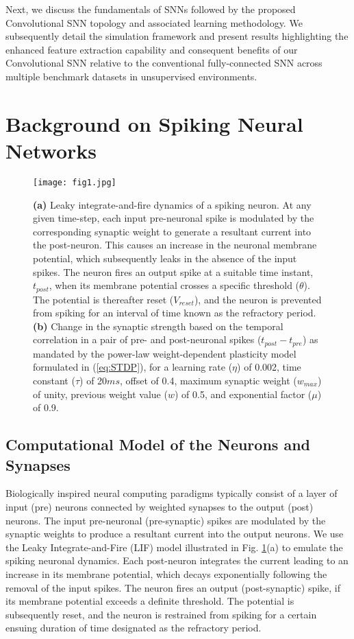 \documentclass[journal, onecolumn]{IEEEtran}
\begin{document}
Next, we discuss the fundamentals of SNNs followed by the proposed Convolutional SNN topology and associated learning methodology. We subsequently detail the simulation framework and present results highlighting the enhanced feature extraction capability and consequent benefits of our Convolutional SNN relative to the conventional fully-connected SNN across multiple benchmark datasets in unsupervised environments.
\section*{\large\bf{Background on Spiking Neural Networks}}
\begin{figure}[!t]
\centering
\texttt{[image: fig1.jpg]}
\caption{\textbf{(a)} Leaky integrate-and-fire dynamics of a spiking neuron. At any given time-step, each input pre-neuronal spike is modulated by the corresponding synaptic weight to generate a resultant current into the post-neuron. This causes an increase in the neuronal membrane potential, which subsequently leaks in the absence of the input spikes. The neuron fires an output spike at a suitable time instant, $t_{post}$, when its membrane potential crosses a specific threshold ($\theta$). The potential is thereafter reset ($V_{reset}$), and the neuron is prevented from spiking for an interval of time known as the refractory period. \textbf{(b)} Change in the synaptic strength based on the temporal correlation in a pair of pre- and post-neuronal spikes ($t_{post}-t_{pre}$) as mandated by the power-law weight-dependent plasticity model formulated in (\ref{eq:STDP}), for a learning rate ($\eta$) of 0.002, time constant ($\tau$) of 20$ms$, offset of 0.4, maximum synaptic weight ($w_{max}$) of unity, previous weight value ($w$) of 0.5, and exponential factor ($\mu$) of 0.9.}
\label{fig:LIF_Dynamics_STDP}
\end{figure}

\subsection*{\normalsize\bf{Computational Model of the Neurons and Synapses}}
Biologically inspired neural computing paradigms typically consist of a layer of input (pre) neurons connected by weighted synapses to the output (post) neurons. The input pre-neuronal (pre-synaptic) spikes are modulated by the synaptic weights to produce a resultant current into the output neurons. We use the Leaky Integrate-and-Fire (LIF) model \cite{diehl2015unsupervised} illustrated in Fig. \ref{fig:LIF_Dynamics_STDP}(a) to emulate the spiking neuronal dynamics. Each post-neuron integrates the current leading to an increase in its membrane potential, which decays exponentially following the removal of the input spikes. The neuron fires an output (post-synaptic) spike, if its membrane potential exceeds a definite threshold. The potential is subsequently reset, and the neuron is restrained from spiking for a certain ensuing duration of time designated as the refractory period.
\end{document}
